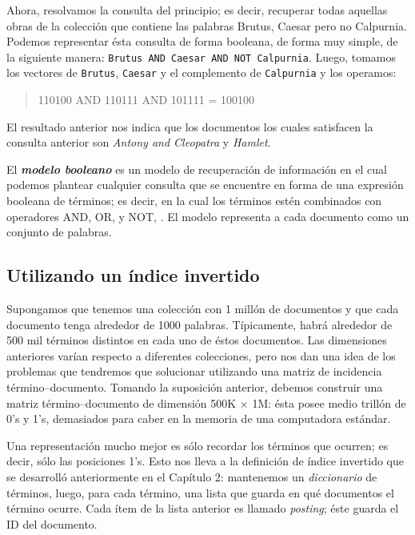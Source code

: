 	Ahora, resolvamos la consulta del principio; es decir, recuperar todas aquellas obras de la colección que contiene las palabras Brutus, Caesar pero no Calpurnia. Podemos representar ésta consulta de forma booleana, de forma muy simple, de la siguiente manera: \texttt{Brutus AND Caesar AND NOT Calpurnia}. Luego, tomamos los vectores de \texttt{Brutus}, \texttt{Caesar} y el complemento de \texttt{Calpurnia} y los operamos:
	\begin{quote}
		\begin{ttfamily}
			110100 AND 110111 AND 101111 = 100100
		\end{ttfamily}
	\end{quote}
	El resultado anterior nos indica que los documentos los cuales satisfacen la consulta anterior son \textit{Antony and Cleopatra} y \textit{Hamlet}. \par
	
	El \textbf{\textit{modelo booleano}} es un modelo de recuperación de información en el cual podemos plantear cualquier consulta que se encuentre en forma de una expresión booleana de términos; es decir, en la cual los términos estén combinados con operadores AND, OR, y NOT, \cite{manning2009}. El modelo representa a cada documento como un conjunto de palabras.
	
	\subsection{Utilizando un índice invertido}
		Supongamos que tenemos una colección con 1 millón de documentos y que cada documento tenga alrededor de 1000 palabras. Típicamente, habrá alrededor de 500 mil términos distintos en cada uno de éstos documentos. Las dimensiones anteriores varían respecto a diferentes colecciones, pero nos dan una idea de los problemas que tendremos que solucionar utilizando una matriz de incidencia término--documento. Tomando la suposición anterior, debemos construir una matriz término--documento de dimensión 500K $\times$ 1M: ésta posee medio trillón de 0's y 1's, demasiados para caber en la memoria de una computadora estándar. \par
		
		Una representación mucho mejor es sólo recordar los términos que ocurren; es decir, sólo las posiciones 1's. Esto nos lleva a la definición de índice invertido que se desarrolló anteriormente en el Capítulo 2: mantenemos un \textit{diccionario} de términos, luego, para cada término, una lista que guarda en qué documentos el término ocurre. Cada ítem de la lista anterior es llamado \textit{posting}; éste guarda el ID del documento. \par
		

